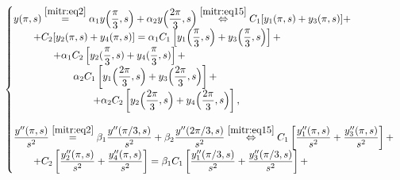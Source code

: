 \begin{equation}

\label{mitr:eq16}

\!\begin{cases}

\displaystyle

y(\pi,s)\stackrel{\eqref{mitr:eq2}}{=} \alpha_1y \Bigl(\frac\pi3,s \Bigr)+

\alpha_2 y \Bigl(\frac{2\pi}3,s \Bigr)

 \stackrel{\eqref{mitr:eq15}}{\Leftrightarrow}

C_1[y_1(\pi,s)+y_3(\pi,s)]+\\

\displaystyle \qquad 

 +

C_2[y_2(\pi,s)+y_4(\pi,s)]=

\alpha_1 C_1\left[y_1\Bigl(\frac\pi3,s\Bigr)+y_3\Bigl(\frac\pi3,s\Bigr)\right]+\\

\displaystyle \qquad \qquad 

+\alpha_1 C_2\left[y_2(\frac\pi3,s)+ y_4(\frac\pi3,s)\right]+ \\

\displaystyle \qquad \qquad \qquad 

\alpha_2 C_1\left[y_1 \Bigl(\frac{2\pi}3,s\Bigr)+y_3\Bigl(\frac{2\pi}3,s\Bigr)\right]+\\

\displaystyle \qquad \qquad \qquad \qquad 

+\alpha_2 C_2\left[y_2 \Bigl(\frac{2\pi}3,s\Bigr)+y_4\Bigl(\frac{2\pi}3,s\Bigr)\right],\\[6mm]

\displaystyle

\frac{y''(\pi,s)}{s^2} \stackrel{\eqref{mitr:eq2}}{=}

\beta_1\frac{y''(\pi/3,s)}{s^2}+ \beta_2\frac{y''({2\pi}/3,s)}{s^2}

\stackrel{\eqref{mitr:eq15}}{\Leftrightarrow}

C_1\left[\frac{y''_1(\pi,s)}{s^2} +\frac{y''_3(\pi,s)}{s^2}\right]+\\ 

\displaystyle \qquad 

+

C_2\left[\frac{y''_2(\pi,s)}{s^2} +\frac{y''_4(\pi,s)}{s^2}\right]=

\beta_1 C_1\left[\frac{y''_1(\pi/3,s)}{s^2} +\frac{y''_3(\pi/3,s)}{s^2}\right]+\\


\end{cases}
\end{equation}
